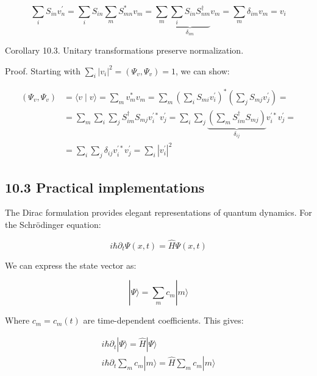\documentclass[10pt]{article}
\begin{document}
\begin{equation*}
\sum_{i} S_{i n} v_{n}^{\prime}=\sum_{i} S_{i n} \sum_{m} S_{m n}^{*} v_{m}=\sum_{m} \underbrace{\sum_{i} S_{i n} S_{n m}^{\dagger}}_{\delta_{i m}} v_{m}=\sum_{m} \delta_{i m} v_{m}=v_{i} \tag{10.18}
\end{equation*}

Corollary 10.3. Unitary transformations preserve normalization.

Proof. Starting with $\sum_{i}\left|v_{i}\right|^{2}=\left(\Psi_{v}, \Psi_{v}\right)=1$, we can show:

\begin{align*}
\left(\Psi_{v}, \Psi_{v}\right) & =\langle v \mid v\rangle=\sum_{m} v_{m}^{*} v_{m}=\sum_{m}\left(\sum_{i} S_{m i} v_{i}^{\prime}\right)^{*}\left(\sum_{j} S_{m j} v_{j}^{\prime}\right)= \\
& =\sum_{m} \sum_{i} \sum_{j} S_{i m}^{\dagger} S_{m j} v_{i}^{\prime*} v_{j}^{\prime}=\sum_{i} \sum_{j} \underbrace{\left(\sum_{m} S_{i m}^{\dagger} S_{m j}\right)}_{\delta_{i j}} v_{i}^{\prime*} v_{j}^{\prime}=  \tag{10.19}\\
& =\sum_{i} \sum_{j} \delta_{i j} v_{i}^{\prime*} v_{j}^{\prime}=\sum_{i}\left|v_{i}^{\prime}\right|^{2}
\end{align*}

\subsection*{10.3 Practical implementations}
The Dirac formulation provides elegant representations of quantum dynamics. For the Schrödinger equation:

\begin{equation*}
i \hbar \partial_{t} \Psi(x, t)=\hat{H} \Psi(x, t) \tag{10.20}
\end{equation*}

We can express the state vector as:

\begin{equation*}
|\Psi\rangle=\sum_{m} c_{m}|m\rangle \tag{10.21}
\end{equation*}

Where $c_{m}=c_{m}(t)$ are time-dependent coefficients. This gives:

\[
\begin{array}{r}
i \hbar \partial_{t}|\Psi\rangle=\hat{H}|\Psi\rangle \\
i \hbar \partial_{t} \sum_{m} c_{m}|m\rangle=\hat{H} \sum_{m} c_{m}|m\rangle \tag{10.22}
\end{array}
\]
\end{document}
